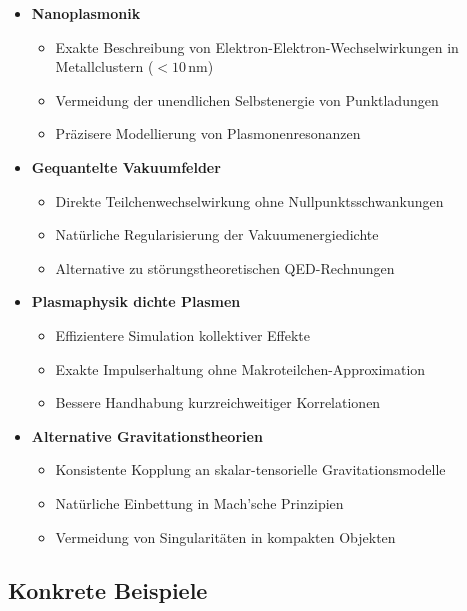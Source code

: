 \begin{itemize}
    \item \textbf{Nanoplasmonik}
    \begin{itemize}
        \item Exakte Beschreibung von Elektron-Elektron-Wechselwirkungen in Metallclustern ($<10$\,nm)
        \item Vermeidung der unendlichen Selbstenergie von Punktladungen
        \item Präzisere Modellierung von Plasmonenresonanzen
    \end{itemize}
    
    \item \textbf{Gequantelte Vakuumfelder}
    \begin{itemize}
        \item Direkte Teilchenwechselwirkung ohne Nullpunktsschwankungen
        \item Natürliche Regularisierung der Vakuumenergiedichte
        \item Alternative zu störungstheoretischen QED-Rechnungen
    \end{itemize}
    
    \item \textbf{Plasmaphysik dichte Plasmen}
    \begin{itemize}
        \item Effizientere Simulation kollektiver Effekte
        \item Exakte Impulserhaltung ohne Makroteilchen-Approximation
        \item Bessere Handhabung kurzreichweitiger Korrelationen
    \end{itemize}
    
    \item \textbf{Alternative Gravitationstheorien}
    \begin{itemize}
        \item Konsistente Kopplung an skalar-tensorielle Gravitationsmodelle
        \item Natürliche Einbettung in Mach'sche Prinzipien
        \item Vermeidung von Singularitäten in kompakten Objekten
    \end{itemize}
\end{itemize}

\subsection{Konkrete Beispiele}

